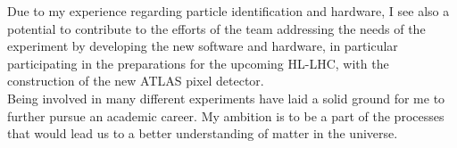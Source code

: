 \documentclass[a4paper,roman]{article}
\begin{document}
Due to my experience regarding particle identification and hardware, I see also a potential to contribute to the efforts of the team addressing the needs of the experiment by developing the new software and hardware, in particular participating in the preparations for the upcoming HL-LHC, with the construction of the new ATLAS pixel detector.\\
Being involved in many different experiments have laid a solid ground for me to further pursue an academic career. My ambition is to be a part of the processes that would lead us to a better understanding of matter in the universe.
\end{document}
